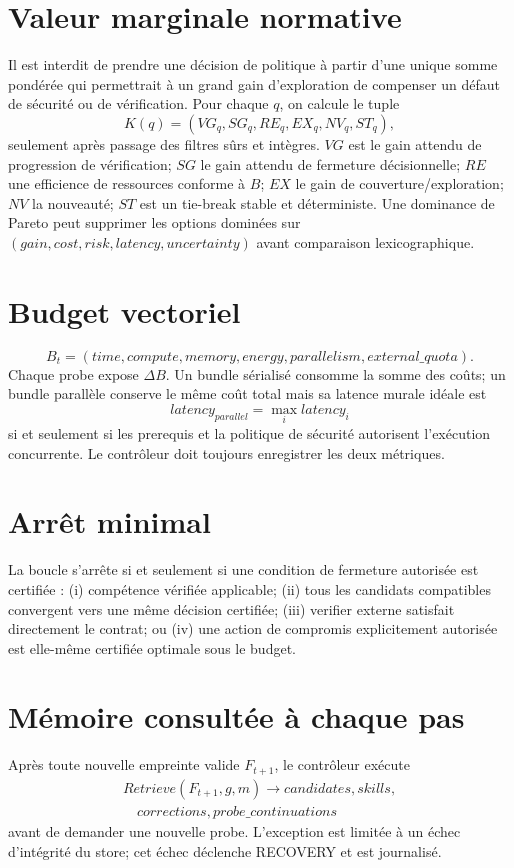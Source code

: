 \documentclass[11pt,a4paper]{report}
\begin{document}
\section{Valeur marginale normative}
Il est interdit de prendre une décision de politique à partir d'une unique somme pondérée qui permettrait à un grand gain d'exploration de compenser un défaut de sécurité ou de vérification. Pour chaque $q$, on calcule le tuple
\[
K(q)=(VG_q,SG_q,RE_q,EX_q,NV_q,ST_q),
\]
seulement après passage des filtres sûrs et intègres. $VG$ est le gain attendu de progression de vérification; $SG$ le gain attendu de fermeture décisionnelle; $RE$ une efficience de ressources conforme à $B$; $EX$ le gain de couverture/exploration; $NV$ la nouveauté; $ST$ est un tie-break stable et déterministe. Une dominance de Pareto peut supprimer les options dominées sur $(gain,cost,risk,latency,uncertainty)$ avant comparaison lexicographique.

\section{Budget vectoriel}
\[
B_t=(time,compute,memory,energy,parallelism,external\_quota).
\]
Chaque probe expose $\Delta B$. Un bundle sérialisé consomme la somme des coûts; un bundle parallèle conserve le même coût total mais sa latence murale idéale est
\[
latency_{parallel}=\max_i latency_i
\]
si et seulement si les prerequis et la politique de sécurité autorisent l'exécution concurrente. Le contrôleur doit toujours enregistrer les deux métriques.

\section{Arrêt minimal}
La boucle s'arrête si et seulement si une condition de fermeture autorisée est certifiée : (i) compétence vérifiée applicable; (ii) tous les candidats compatibles convergent vers une même décision certifiée; (iii) verifier externe satisfait directement le contrat; ou (iv) une action de compromis explicitement autorisée est elle-même certifiée optimale sous le budget.

\section{Mémoire consultée à chaque pas}
Après toute nouvelle empreinte valide $F_{t+1}$, le contrôleur exécute
\[
\begin{aligned}
Retrieve(F_{t+1},g,m)\to candidates,skills,\\
\quad corrections,probe\_continuations
\end{aligned}
\]
avant de demander une nouvelle probe. L'exception est limitée à un échec d'intégrité du store; cet échec déclenche RECOVERY et est journalisé.
\end{document}
